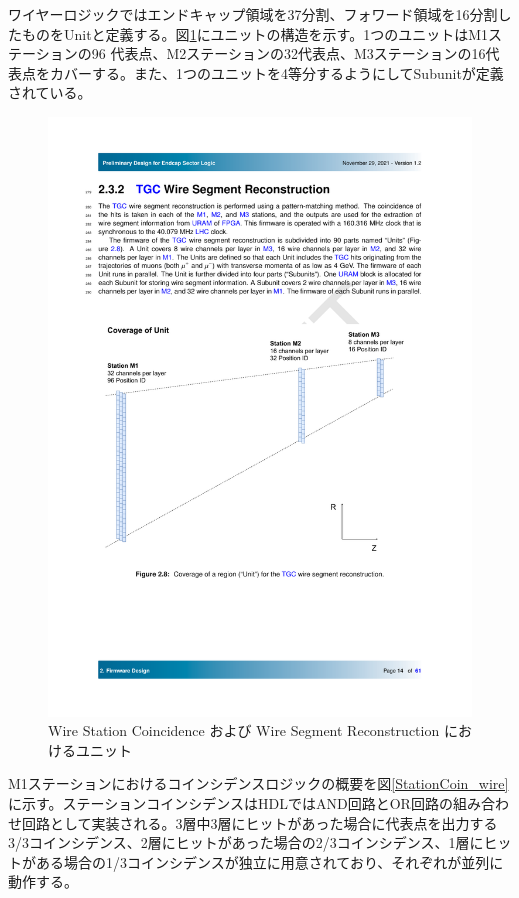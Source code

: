 ワイヤーロジックではエンドキャップ領域を37分割、フォワード領域を16分割したものをUnitと定義する。図\ref{StationCoin_unit}にユニットの構造を示す。1つのユニットはM1ステーションの96 代表点、M2ステーションの32代表点、M3ステーションの16代表点をカバーする。また、1つのユニットを4等分するようにしてSubunitが定義されている。

\begin{figure} 
    \centering
    \includegraphics[width=16cm]{fig/SL/StationCoin_unit.pdf}
    \caption[Wire Station Coincidence および Wire Segment Reconstruction におけるユニット]{Wire Station Coincidence および Wire Segment Reconstruction におけるユニット}
    \label{StationCoin_unit}
\end{figure}

M1ステーションにおけるコインシデンスロジックの概要を図\ref{StationCoin_wire}に示す。ステーションコインシデンスはHDLではAND回路とOR回路の組み合わせ回路として実装される。3層中3層にヒットがあった場合に代表点を出力する3/3コインシデンス、2層にヒットがあった場合の2/3コインシデンス、1層にヒットがある場合の1/3コインシデンスが独立に用意されており、それぞれが並列に動作する。

